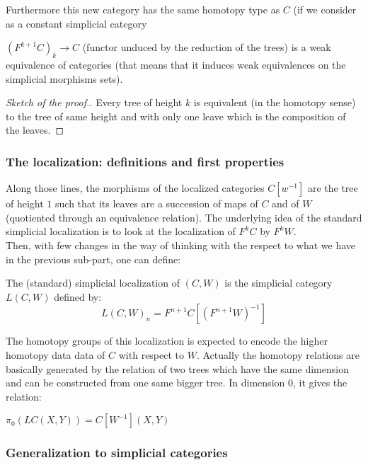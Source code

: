 \begin{refsection}
Furthermore this new category has the same homotopy type as $C$ (if we consider as a constant simplicial category

\begin{prop}
$(F^{k+1}C)_k \rightarrow C$ (functor unduced by the reduction of the trees) is a weak equivalence of categories (that means that it induces weak equivalences on the simplicial morphisms sets).
\end{prop} 

\begin{proof}[Sketch of the proof.]
Every tree of height $k$ is equivalent (in the homotopy sense) to the tree of same height and with only one leave which is the composition of the leaves.
\end{proof}

\subsubsection{The localization: definitions and first properties}

Along those lines, the morphisms of the localized categories $C[w^{-1}]$ are the tree of height $1$ such that its leaves are a succession of maps of $C$ and of $W$ (quotiented through an equivalence relation). The underlying idea of the standard simplicial localization is to look at the localization of $F^{k} C$ by $F^{k} W$.\\

Then, with few changes in the way of thinking with the respect to what we have in the previous sub-part, one can define: 

\begin{defin}
The (standard) simplicial localization of $(C,W)$ is the simplicial category $L(C,W)$ defined by:
\begin{equation}
L(C,W)_n=F^{n+1}C[(F^{n+1}W)^{-1}]
\end{equation}
\end{defin}

The homotopy groups of this localization is expected to encode the higher homotopy data data of $C$ with respect to $W$. Actually the homotopy relations are basically generated by the relation of two trees which have the same dimension and can be constructed from one same bigger tree. In dimension $0$, it gives the relation: 

\begin{prop}
$\pi_0 (LC(X,Y))=C[W^{-1}](X,Y)$
\end{prop}

\subsubsection{Generalization to simplicial categories}


\end{refsection}
